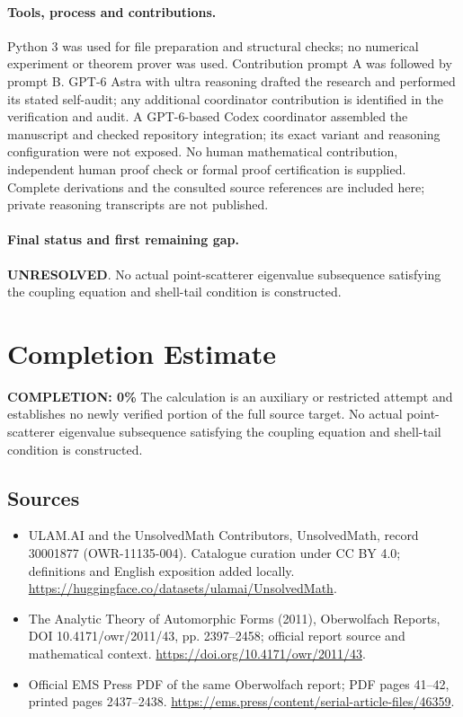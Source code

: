 \documentclass[11pt]{article}
\begin{document}
\paragraph{Tools, process and contributions.}
Python 3 was used for file preparation and structural checks; no numerical experiment or theorem prover was used. Contribution prompt A was followed by prompt B. GPT-6 Astra with ultra reasoning drafted the research and performed its stated self-audit; any additional coordinator contribution is identified in the verification and audit. A GPT-6-based Codex coordinator assembled the manuscript and checked repository integration; its exact variant and reasoning configuration were not exposed. No human mathematical contribution, independent human proof check or formal proof certification is supplied. Complete derivations and the consulted source references are included here; private reasoning transcripts are not published.

\paragraph{Final status and first remaining gap.}
\textbf{UNRESOLVED}. No actual point-scatterer eigenvalue subsequence satisfying the coupling equation and shell-tail condition is constructed.

\section{Completion Estimate}
\noindent\textbf{COMPLETION: 0\%}
The calculation is an auxiliary or restricted attempt and establishes no newly verified portion of the full source target. No actual point-scatterer eigenvalue subsequence satisfying the coupling equation and shell-tail condition is constructed.

\subsection{Sources}
\begin{itemize}
\item[\hypertarget{source:30001877:1}{S1}] ULAM.AI and the UnsolvedMath Contributors, UnsolvedMath, record 30001877 (OWR-11135-004). Catalogue curation under CC BY 4.0; definitions and English exposition added locally.
\url{https://huggingface.co/datasets/ulamai/UnsolvedMath}.
\item[\hypertarget{source:30001877:2}{S2}] The Analytic Theory of Automorphic Forms (2011), Oberwolfach Reports, DOI 10.4171/owr/2011/43, pp. 2397--2458; official report source and mathematical context.
\url{https://doi.org/10.4171/owr/2011/43}.
\item[\hypertarget{source:30001877:3}{S3}] Official EMS Press PDF of the same Oberwolfach report; PDF pages 41--42, printed pages 2437--2438.
\url{https://ems.press/content/serial-article-files/46359}.
\end{itemize}
\label{end:30001877}
\end{document}

